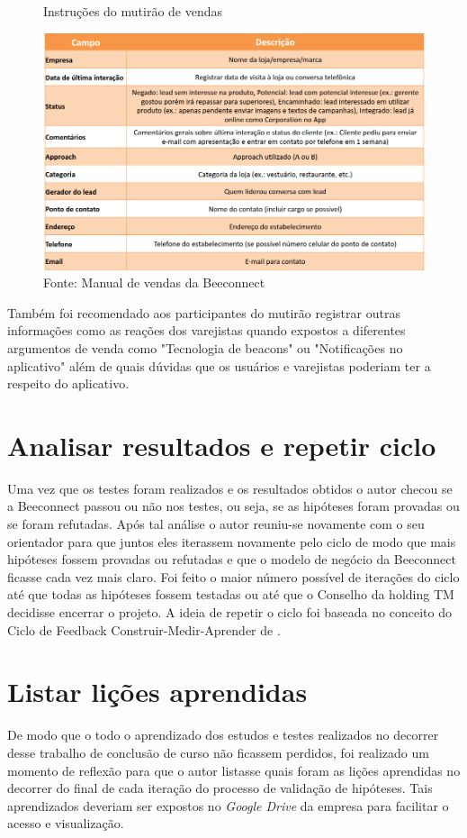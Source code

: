 \begin{figure}[H]
\caption{Instruções do mutirão de vendas}
\centerline{\includegraphics[width=1.0\textwidth]{img/intrucoes_mutirao}}
\label{fig:intrucoes_mutirao}
\caption* {Fonte: Manual de vendas da Beeconnect}
\end{figure}

Também foi recomendado aos participantes do mutirão registrar outras informações como as reações dos varejistas quando expostos a diferentes argumentos de venda como "Tecnologia de beacons" ou "Notificações no aplicativo" além de quais dúvidas que os usuários e varejistas poderiam ter a respeito do aplicativo.

\section{Analisar resultados e repetir ciclo}
\label{cha:analisar_resultados}
Uma vez que os testes foram realizados e os resultados obtidos o autor checou se a Beeconnect passou ou não nos testes, ou seja, se as hipóteses foram provadas ou se foram refutadas. 
Após tal análise o autor reuniu-se novamente com o seu orientador para que juntos eles iterassem novamente pelo ciclo de modo que mais hipóteses fossem provadas ou refutadas e que o modelo de negócio da Beeconnect ficasse cada vez mais claro. Foi feito o maior número possível de iterações do ciclo até que todas as hipóteses fossem testadas ou até que o Conselho da holding TM decidisse encerrar o projeto. A ideia de repetir o ciclo foi baseada no conceito do Ciclo de Feedback Construir-Medir-Aprender de .

\section{Listar lições aprendidas}
\label{cha:listar_licoes_aprendidas}
De modo que o todo o aprendizado dos estudos e testes realizados no decorrer desse trabalho de conclusão de curso não ficassem perdidos, foi realizado um momento de reflexão para que o autor listasse quais foram as lições aprendidas no decorrer do final de cada iteração do processo de validação de hipóteses. Tais aprendizados deveriam ser expostos no \textit{Google Drive} da empresa para facilitar o acesso e visualização.

